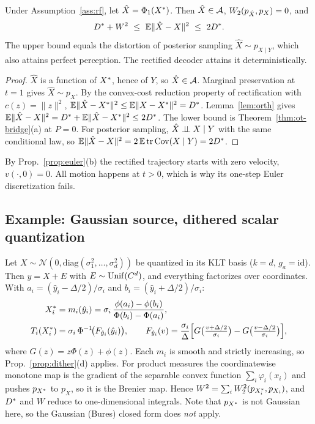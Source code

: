 \begin{theorem}\label{thm:rectified}
Under Assumption~\ref{ass:rf}, let $\hat X=\Phi_1(X^{*})$. Then $\hat X\in\mathcal{A}$, $W_2(p_{\hat X},p_X)=0$, and
\begin{equation}
  D^{*}+W^2\ \le\ \mathbb{E}\|\hat X-X\|^2\ \le\ 2D^{*} .
\end{equation}
The upper bound equals the distortion of posterior sampling $\hat X\sim p_{X\mid Y}$, which also attains perfect perception. The rectified decoder attains it deterministically.
\end{theorem}
\begin{proof}
$\hat X$ is a function of $X^{*}$, hence of $Y$, so $\hat X\in\mathcal{A}$. Marginal preservation at $t=1$ gives $\hat X\sim p_X$. By the convex-cost reduction property of rectification \cite{liu2023flow} with $c(z)=\|z\|^2$,
$\mathbb{E}\|\hat X-X^{*}\|^2\le\mathbb{E}\|X-X^{*}\|^2=D^{*}$.
Lemma~\ref{lem:orth} gives $\mathbb{E}\|\hat X-X\|^2=D^{*}+\mathbb{E}\|\hat X-X^{*}\|^2\le2D^{*}$. The lower bound is Theorem~\ref{thm:ot-bridge}(a) at $P=0$. For posterior sampling, $\hat X\perp\!\!\!\perp X\mid Y$ with the same conditional law, so $\mathbb{E}\|\hat X-X\|^2=2\,\mathbb{E}\,\mathrm{tr}\,\mathrm{Cov}(X\mid Y)=2D^{*}$.
\end{proof}

By Prop.~\ref{prop:euler}(b) the rectified trajectory starts with zero velocity, $v(\cdot,0)=0$. All motion happens at $t>0$, which is why its one-step Euler discretization fails.

\subsection{Example: Gaussian source, dithered scalar quantization}
\label{sec:app-toy}

Let $X\sim\mathcal N(0,\mathrm{diag}(\sigma_1^2,\dots,\sigma_d^2))$ be quantized in its KLT basis ($k=d$, $g_a=\mathrm{id}$). Then $\hat y=X+E$ with $E\sim\mathrm{Unif}(C^d)$, and everything factorizes over coordinates. With $a_i=(\hat y_i-\Delta/2)/\sigma_i$ and $b_i=(\hat y_i+\Delta/2)/\sigma_i$:
\begin{align}
  X^{*}_i&=m_i(\hat y_i)=\sigma_i\,\frac{\phi(a_i)-\phi(b_i)}{\Phi(b_i)-\Phi(a_i)}, \\
  T_i(X^{*}_i)&=\sigma_i\,\Phi^{-1}\!\bigl(F_{\hat y_i}(\hat y_i)\bigr),\qquad
  F_{\hat y_i}(v)=\frac{\sigma_i}{\Delta}\Bigl[G\bigl(\tfrac{v+\Delta/2}{\sigma_i}\bigr)-G\bigl(\tfrac{v-\Delta/2}{\sigma_i}\bigr)\Bigr],
\end{align}
where $G(z)=z\Phi(z)+\phi(z)$. Each $m_i$ is smooth and strictly increasing, so Prop.~\ref{prop:dither}(d) applies. For product measures the coordinatewise monotone map is the gradient of the separable convex function $\sum_i\varphi_i(x_i)$ and pushes $p_{X^{*}}$ to $p_X$, so it is the Brenier map. Hence $W^2=\sum_iW_2^2(p_{X^{*}_i},p_{X_i})$, and $D^{*}$ and $W$ reduce to one-dimensional integrals. Note that $p_{X^{*}}$ is not Gaussian here, so the Gaussian (Bures) closed form does \emph{not} apply.
